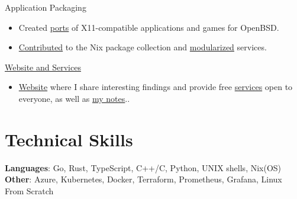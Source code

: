 \documentclass[margin,line]{../res}
\begin{document}
\begin{resume}
	Application Packaging
	\begin{itemize}
		\item Created \href{https://github.com/theobori/openbsd-ports}{ports} of X11-compatible applications and games for OpenBSD.
		\item \href{https://repology.org/maintainer/theo1.bori@epitech.eu}{Contributed} to the Nix package collection and \href{https://github.com/theobori/nix-teeworlds}{modularized} services.
	\end{itemize}

	\href{https://github.com/theobori-cafe}{Website and Services}
	\begin{itemize}
		\item \href{https://theobori.cafe}{Website} where I share interesting findings and provide free \href{https://services.theobori.cafe}{services} open to everyone, as well as \href{https://zettel.theobori.cafe}{my notes}..
	\end{itemize}

	\section{\sc Technical Skills}
	\textbf{Languages}: Go, Rust, TypeScript, C++/C, Python, UNIX shells, Nix(OS)\\
	\textbf{Other}: Azure, Kubernetes, Docker, Terraform, Prometheus, Grafana, Linux From Scratch

\end{resume}
\end{document}
